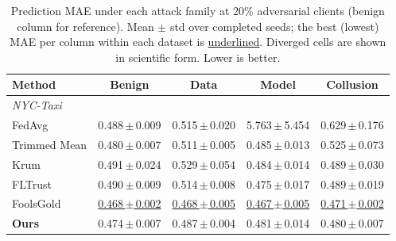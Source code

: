 \begin{table}[t]
\centering
\small
\setlength{\tabcolsep}{5pt}
\caption{Prediction MAE under each attack family at 20\% adversarial clients (benign column for reference). Mean $\pm$ std over completed seeds; the best (lowest) MAE per column within each dataset is \underline{underlined}. Diverged cells are shown in scientific form. Lower is better.}
\label{tab:combined}
\begin{tabular}{lcccc}
\toprule
\textbf{Method} & \textbf{Benign} & \textbf{Data} & \textbf{Model} & \textbf{Collusion} \\
\midrule
\multicolumn{5}{l}{\textit{NYC-Taxi}} \\
FedAvg & 0.488\,$\pm$\,0.009 & 0.515\,$\pm$\,0.020 & 5.763\,$\pm$\,5.454 & 0.629\,$\pm$\,0.176 \\
Trimmed Mean & 0.480\,$\pm$\,0.007 & 0.511\,$\pm$\,0.005 & 0.485\,$\pm$\,0.013 & 0.525\,$\pm$\,0.073 \\
Krum & 0.491\,$\pm$\,0.024 & 0.529\,$\pm$\,0.054 & 0.484\,$\pm$\,0.014 & 0.489\,$\pm$\,0.030 \\
FLTrust & 0.490\,$\pm$\,0.009 & 0.514\,$\pm$\,0.008 & 0.475\,$\pm$\,0.017 & 0.489\,$\pm$\,0.019 \\
FoolsGold & \underline{0.468\,$\pm$\,0.002} & \underline{0.468\,$\pm$\,0.005} & \underline{0.467\,$\pm$\,0.005} & \underline{0.471\,$\pm$\,0.002} \\
\textbf{Ours} & 0.474\,$\pm$\,0.007 & 0.487\,$\pm$\,0.004 & 0.481\,$\pm$\,0.014 & 0.480\,$\pm$\,0.007 \\
\bottomrule
\end{tabular}
\end{table}
